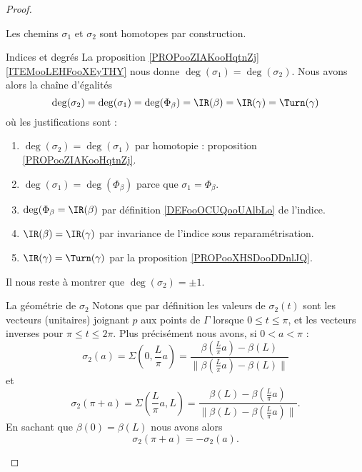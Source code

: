 \begin{proof}
\begin{subproof}
            Les chemins \( \sigma_1\) et \( \sigma_2\) sont homotopes par construction.
        \item[Indices et degrés]
            La proposition \ref{PROPooZIAKooHqtnZj}\ref{ITEMooLEHFooXEyTHY} nous donne \( \deg(\sigma_1)=\deg(\sigma_2)\). Nous avons alors la chaîne d'égalités
            \begin{equation}        \label{EQooSXOAooZVOVxc}
                \deg(\sigma_2)=\deg(\sigma_1)=\deg(\Phi_{\beta})=\IR(\beta)=\IR(\gamma)=\Turn(\gamma)
            \end{equation}
            où les justifications sont :
            \begin{enumerate}
                \item
                    \( \deg(\sigma_2)=\deg(\sigma_1)\) par homotopie : proposition \ref{PROPooZIAKooHqtnZj}.
                \item
                    \( \deg(\sigma_1)=\deg(\Phi_{\beta})\) parce que \( \sigma_1=\Phi_{\beta}\).
                \item
                    \( \deg(\Phi_{\beta}=\IR(\beta)\) par définition \ref{DEFooOCUQooUAlbLo} de l'indice.
                \item
                    \(  \IR(\beta)=\IR(\gamma) \) par invariance de l'indice sous reparamétrisation.
                \item
                    \( \IR(\gamma)=\Turn(\gamma)\) par la proposition \ref{PROPooXHSDooDDnlJQ}.
            \end{enumerate}
            Il nous reste à montrer que \( \deg(\sigma_2)=\pm 1\). 
        \item[La géométrie de \( \sigma_2\)]
            Notons que par définition les valeurs de \( \sigma_2(t)\) sont les vecteurs (unitaires) joignant \( p\) aux points de \( \Gamma\) lorsque \( 0\leq t\leq \pi\), et les vecteurs inverses pour \( \pi\leq t\leq 2\pi\). Plus précisément nous avons, si \( 0<a<\pi\) :
            \begin{equation}
                \sigma_2(a)=\Sigma(0,\frac{ L }{ \pi }a)=\frac{ \beta(\frac{ L }{ \pi }a)-\beta(L) }{ \|    \beta(\frac{ L }{ \pi }a)-\beta(L)   \| }
            \end{equation}
            et
            \begin{equation}
                \sigma_2(\pi+a)=\Sigma(\frac{ L }{\pi  }a,L)=\frac{ \beta(L)-\beta(\frac{ L }{ \pi }a) }{ \|   \beta(L)-\beta(\frac{ L }{ \pi }a) \| }.
            \end{equation}
            En sachant que \( \beta(0)=\beta(L)\) nous avons alors
            \begin{equation}        \label{EQooKMSRooEzWkyL}
                \sigma_2(\pi+a)=-\sigma_2(a).
            \end{equation}


\end{subproof}
\end{proof}
